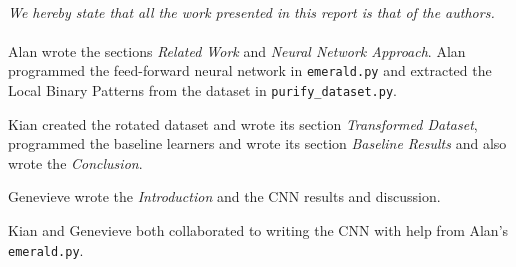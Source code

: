 \newpage
\begin{multicols}{2}
\paragraph*{} \lettrine[nindent=0em,lines=1]{\textit{W}}{}\textit{e hereby state that all the work presented in this report is that of the authors. }
\paragraph*{} Alan wrote the sections \emph{Related Work} and \emph{Neural Network Approach}. Alan programmed the feed-forward neural network in \texttt{emerald.py} and extracted the Local Binary Patterns from the dataset in \texttt{purify\_dataset.py}. 
\par Kian created the rotated dataset and wrote its section \emph{Transformed Dataset}, programmed the baseline learners and wrote its section \emph{Baseline Results} and also wrote the \emph{Conclusion}. 
\par Genevieve wrote the \emph{Introduction} and the CNN results and discussion. 
\par Kian and Genevieve both collaborated to writing the CNN with help from Alan's \texttt{emerald.py}. 


\end{multicols}

